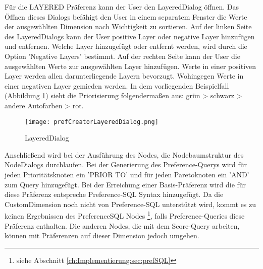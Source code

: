 Für die LAYERED Präferenz kann der User den LayeredDialog öffnen. Das Öffnen dieses Dialogs befähigt den User in einem separatem Fenster die Werte der ausgewählten Dimension nach Wichtigkeit zu sortieren.
Auf der linken Seite des LayeredDialogs kann der User positive Layer oder negative Layer hinzufügen und entfernen. Welche Layer hinzugefügt oder entfernt werden, wird durch die Option 'Negative Layers' bestimmt. Auf der rechten Seite kann der User die ausgewählten Werte zur ausgewählten Layer hinzufügen. Werte in einer positiven Layer werden allen darunterliegende Layern bevorzugt. Wohingegen Werte in einer negativen Layer gemieden werden. In dem vorliegenden Beispielfall (Abbildung \ref{img:prefCreatorLayeredDialog}) sieht die Priorisierung folgendermaßen aus: grün > schwarz > andere Autofarben > rot. 

\begin{figure}[H]
	\centering
	\texttt{[image: prefCreatorLayeredDialog.png]}
	\caption{LayeredDialog}
	\label{img:prefCreatorLayeredDialog}
\end{figure}

Anschließend wird bei der Ausführung des Nodes, die Nodebaumstruktur des NodeDialogs durchlaufen.
Bei der Generierung des Preference-Querys wird für jeden Prioritätsknoten ein 'PRIOR TO' und für jeden Paretoknoten ein 'AND' zum Query hinzugefügt. Bei der Erreichung einer Basis-Präferenz wird die für diese Präferenz entspreche Preference-SQL Syntax hinzugefügt. Da die CustomDimension noch nicht von Preference-SQL unterstützt wird, kommt es zu keinen Ergebnissen des PreferenceSQL Nodes \footnote{siehe Abschnitt \ref{ch:Implementierung:sec:prefSQL}}, falls Preference-Queries diese Präferenz enthalten. Die anderen Nodes, die mit dem Score-Query arbeiten, können mit Präferenzen auf dieser Dimension jedoch umgehen. 


